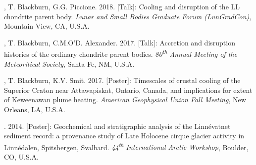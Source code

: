 \begin{etaremune} [itemsep=4pt, leftmargin=3ex]
  \item  \ghedwards, T. Blackburn, G.G. Piccione. 2018. [Talk]: Cooling and disruption of the LL chondrite parent body. \textit{Lunar and Small Bodies Graduate Forum (LunGradCon)}, Mountain View, CA, U.S.A.
	
  \item  \ghedwards, T. Blackburn, C.M.O’D. Alexander. 2017. [Talk]: Accretion and disruption histories of the ordinary chondrite parent bodies. \textit{80\textsuperscript{th} Annual Meeting of the Meteoritical Society}, Santa Fe, NM, U.S.A.
  
  \item \ghedwards, T. Blackburn, K.V. Smit. 2017. [Poster]: Timescales of crustal cooling of the Superior Craton near Attawapiskat, Ontario, Canada, and implications for extent of Keweenawan plume heating. \textit{American Geophysical Union Fall Meeting}, New Orleans, LA, U.S.A.
  
  \item \ghedwards. 2014. [Poster]: Geochemical and stratigraphic analysis of the Linnévatnet sediment record: a provenance study of Late Holocene cirque glacier activity in Linnédalen, Spitsbergen, Svalbard. \textit{44\textsuperscript{th} International Arctic Workshop}, Boulder, CO, U.S.A.
\end{etaremune}



